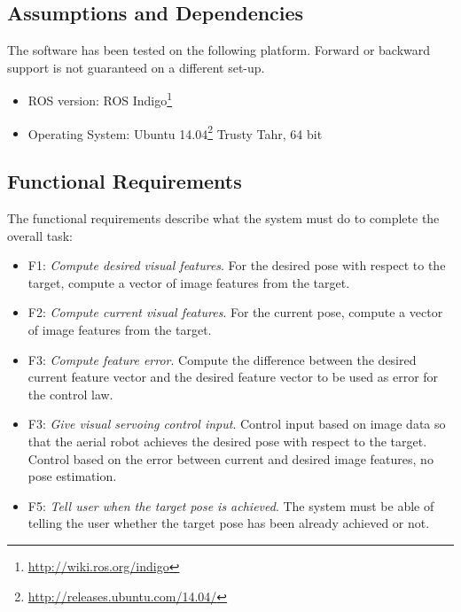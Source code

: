 \subsection{Assumptions and Dependencies}
\label{sec:assumptions-dependencies}

The software  has been tested on the following platform. Forward or backward support is not guaranteed on a different set-up.

\begin{itemize}
	\item ROS version: ROS Indigo\footnote{\url{http://wiki.ros.org/indigo}}
	\item Operating System: Ubuntu 14.04\footnote{\url{http://releases.ubuntu.com/14.04/}} Trusty Tahr, 64 bit
\end{itemize}

\subsection{Functional Requirements}
\label{sec:functional-requirements}

The functional requirements describe what the system must do to complete the overall task:

\begin{itemize}
	\item F1: \emph{Compute desired visual features}. For the desired pose with respect to the target, compute a vector of image features from the target. 
	
	\item F2: \emph{Compute current visual features}. For the current pose, compute a vector of image features from the target. 
	
	\item F3: \emph{Compute feature error}. Compute the difference between the desired current feature vector and the desired feature vector to be used as error for the control law.		
	
	\item F3: \emph{Give visual servoing control input}. Control input based on image data so that the aerial robot achieves the desired pose with respect to the target. Control based on the error between current and desired image features, no pose estimation.
	
	\item F5: \emph{Tell user when the target pose is achieved}. The system must be able of telling the user whether the target pose has been already achieved or not.
	
\end{itemize}

